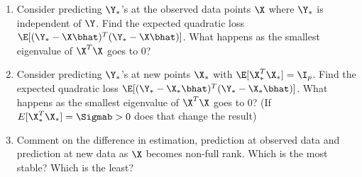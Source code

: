\documentclass{article}
\begin{document}
\begin{enumerate}
\begin{enumerate}
\item Consider predicting $\Y_*$'s at the observed data points $\X$
  where $\Y_*$ is independent of $\Y$.  Find the expected quadratic
  loss $\E[(\Y_* - \X\bhat)^T(\Y_* - \X\bhat)]$.  What happens as the
  smallest eigenvalue of $\X^T\X$ goes to 0?
\item Consider predicting $\Y_*$'s at new points $\X_*$ with
  $\E[\X_*^T\X_*] = \I_p$.  Find the expected quadratic loss
  $\E[(\Y_* - \X_*\bhat)^T(\Y_* - \X_*\bhat)]$.  What
  happens as the smallest eigenvalue of $\X^T\X$ goes to 0?  (If
  $E[\X_*^T\X_*] = \Sigmab > 0$ does that change the result)
\item Comment on the difference in estimation, prediction at observed
  data and prediction at new data as $\X$ becomes non-full rank.
  Which is the most stable?  Which is the least?
  \end{enumerate}
\end{enumerate}
\end{document}
